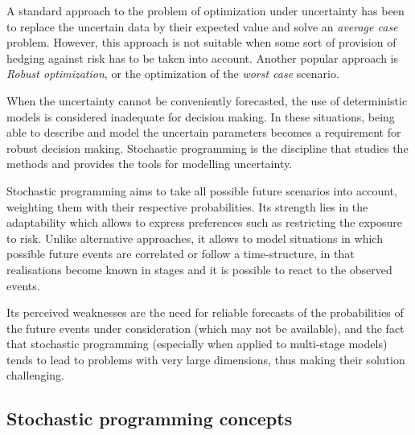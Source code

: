 A standard approach to the problem of optimization under uncertainty
has been to replace the uncertain data by their expected value and
solve an {\em average case} problem. However, this approach is not
suitable when some sort of provision of hedging against risk has to be
taken into account. Another popular approach is {\em Robust
optimization}, or the optimization of the {\em worst case}
scenario. 

When the uncertainty cannot be conveniently forecasted, the use of 
deterministic models is considered inadequate for decision making. In 
these situations, being able to describe and model the uncertain parameters
becomes a requirement for robust decision making. Stochastic 
programming \cite{BirgeLouveaux,KallWallace} is the discipline that 
studies the methods and provides the tools for modelling uncertainty.

Stochastic programming aims to take all possible future scenarios 
into account, weighting them
with their respective probabilities. Its strength lies in the
adaptability which allows to express preferences such as restricting
the exposure to risk. Unlike alternative approaches, it allows to model
situations in which possible future events are correlated or follow a
time-structure, in that realisations become known in stages and it is
possible to react to the observed events.


Its perceived weaknesses are the need for reliable forecasts
of the probabilities of the future events under consideration
(which may not be available), and the fact that stochastic programming
(especially when applied to multi-stage models) tends to lead to
problems with very large dimensions, thus making their solution
challenging. 

%
%
\subsection{Stochastic programming concepts}

